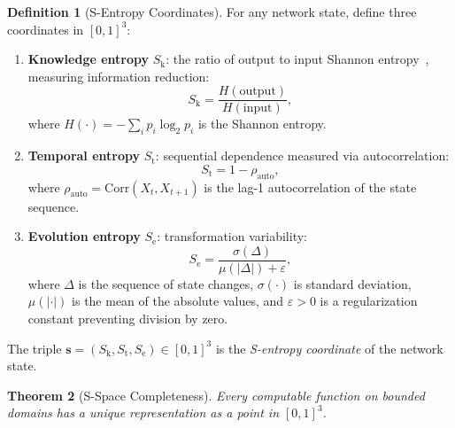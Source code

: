 \documentclass[11pt,twocolumn,a4paper]{article}
\newtheorem{theorem}{Theorem}[section]
\theoremstyle{definition}
\newtheorem{definition}[theorem]{Definition}
\newcommand{\Sk}{S_{\mathrm{k}}}
\newcommand{\St}{S_{\mathrm{t}}}
\newcommand{\Se}{S_{\mathrm{e}}}
\newcommand{\eps}{\varepsilon}
\begin{document}
\begin{definition}[S-Entropy Coordinates]\label{def:sentropy}
For any network state, define three coordinates in $[0,1]^3$:
\begin{enumerate}[label=(\alph*)]
  \item \textbf{Knowledge entropy} $\Sk$: the ratio of output to input Shannon
        entropy~\cite{shannon1948}, measuring information reduction:
        \begin{equation}\label{eq:Sk}
          \Sk = \frac{H(\text{output})}{H(\text{input})},
        \end{equation}
        where $H(\cdot) = -\sum_i p_i \log_2 p_i$ is the Shannon entropy.
  \item \textbf{Temporal entropy} $\St$: sequential dependence measured via
        autocorrelation:
        \begin{equation}\label{eq:St}
          \St = 1 - \rho_{\mathrm{auto}},
        \end{equation}
        where $\rho_{\mathrm{auto}} = \mathrm{Corr}(X_t, X_{t+1})$ is the lag-1
        autocorrelation of the state sequence.
  \item \textbf{Evolution entropy} $\Se$: transformation variability:
        \begin{equation}\label{eq:Se}
          \Se = \frac{\sigma(\Delta)}{\mu(|\Delta|) + \eps},
        \end{equation}
        where $\Delta$ is the sequence of state changes, $\sigma(\cdot)$ is standard
        deviation, $\mu(|\cdot|)$ is the mean of the absolute values, and $\eps > 0$ is a
        regularization constant preventing division by zero.
\end{enumerate}
The triple $\mathbf{s} = (\Sk, \St, \Se) \in [0,1]^3$ is the \emph{S-entropy coordinate}
of the network state.
\end{definition}

\begin{theorem}[S-Space Completeness]\label{thm:sspace_complete}
Every computable function on bounded domains has a unique representation as a point in
$[0,1]^3$.
\end{theorem}
\end{document}
